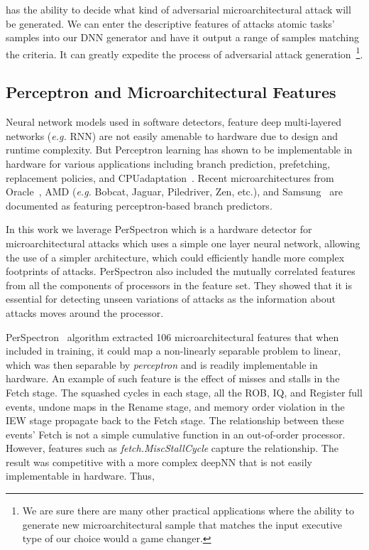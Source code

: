  {\scheme} has the ability to decide what kind of adversarial microarchitectural attack will be generated. We can enter the descriptive features of attacks atomic tasks' samples into our DNN generator and have it output a range of samples matching the criteria. It can greatly expedite the process of adversarial attack generation~\footnote{We are sure there are many other practical applications where the ability to generate new microarchitectural sample that matches the input executive type of our choice would a game changer.}.
 
 \subsection{Perceptron and Microarchitectural Features}

 


Neural network models used in software detectors, feature deep multi-layered  networks ({\em e.g.} RNN) are not easily amenable to hardware due to design and runtime complexity. But Perceptron learning has shown to be implementable in hardware for various  applications including branch prediction, prefetching, replacement policies, and CPUadaptation~\cite{intelISCA2019}. Recent microarchitectures from Oracle~\cite{SPARCT4}, AMD ({\em e.g.} Bobcat, Jaguar, Piledriver, Zen, etc.), and Samsung~\cite{Mongoose,M3} are documented as featuring perceptron-based branch predictors.

In this work we laverage PerSpectron which is a  hardware detector for microarchitectural attacks which uses a simple one layer neural network,  allowing the use of a simpler architecture, which could efficiently 
handle more complex footprints of attacks. 
PerSpectron also included the mutually correlated features from all the components of processors in the feature set. They showed that it is essential for detecting unseen variations of attacks as the information about attacks moves around the processor.


PerSpectron~\cite{PerSpectron} algorithm extracted 106 microarchitectural features that when included in training, it could map a non-linearly separable problem to linear, which was then 
separable by {\em perceptron} and is readily implementable in hardware. An example of such feature is the effect of misses and stalls 
in the Fetch stage. The squashed cycles in each stage, all the ROB, IQ, and 
Register full events, undone maps in the Rename stage, and memory order 
violation in the IEW stage propagate back to the Fetch stage. The relationship 
between these events' Fetch is not a simple cumulative function in an out-of-order 
processor. 
However, features such as \textit{fetch.MiscStallCycle} capture the 
relationship.
The result was competitive 
with a more complex deepNN that is not easily implementable in hardware. Thus, 

